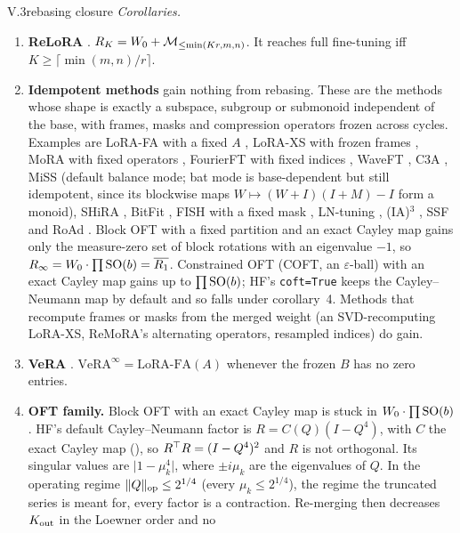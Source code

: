 \begin{theorem}{V.3}{rebasing closure}
\emph{Corollaries.}
\begin{enumerate}[label=\arabic*.,leftmargin=1.6em]
  \item \textbf{ReLoRA} \citep{lialin2023relora}. $R_K=W_0+\mathcal{M}_{\le\min(Kr,m,n)}$. It reaches full fine-tuning iff
  $K\ge\lceil\min(m,n)/r\rceil$.
  \item \textbf{Idempotent methods} gain nothing from rebasing. These are the methods whose shape is exactly a
  subspace, subgroup or submonoid independent of the base, with frames, masks and compression operators frozen across
  cycles. Examples are LoRA-FA with a fixed $A$ \citep{zhang2023lora}, LoRA-XS with frozen frames
  \citep{baazy2024lora}, MoRA with fixed operators \citep{jiang2024mora}, FourierFT with fixed indices
  \citep{gao2024parameter}, WaveFT \citep{bilican2025exploring}, C3A \citep{chen2024parameter}, MiSS
  \citep{kang2024miss} (default balance mode; bat mode is base-dependent but still idempotent, since its blockwise maps
  $W\mapsto(W+I)(I+M)-I$ form a monoid), SHiRA \citep{bhardwaj2024sparse}, BitFit \citep{benzaken2021bitfit}, FISH
  with a fixed mask \citep{sung2021training}, LN-tuning \citep{zhao2023tuning}, (IA)$^3$ \citep{liu2022few}, SSF
  \citep{lian2022scaling} and RoAd \citep{liao20243}. Block OFT with a fixed partition and an exact Cayley map gains
  only the measure-zero set of block rotations with an eigenvalue $-1$, so $R_\infty=W_0\cdot\prod\mathrm{SO}(b)=\overline{R_1}$.
  Constrained OFT (COFT, an $\varepsilon$-ball) with an exact Cayley map gains up to $\prod\mathrm{SO}(b)$; HF's
  \texttt{coft=True} keeps the Cayley--Neumann map by default and so falls under corollary~4. Methods that recompute
  frames or masks from the merged weight (an SVD-recomputing LoRA-XS, ReMoRA's alternating operators, resampled
  indices) do gain.
  \item \textbf{VeRA} \citep{kopiczko2023vera}. $\mathrm{VeRA}^\infty=\text{LoRA-FA}(A)$ whenever the frozen $B$ has no
  zero entries.
  \item \textbf{OFT family.} Block OFT with an exact Cayley map is stuck in $W_0\cdot\prod\mathrm{SO}(b)$. HF's default
  Cayley--Neumann factor is $R=C(Q)(I-Q^4)$, with $C$ the exact Cayley map (), so $R^{\top} R=(I-Q^4)^2$ and $R$
  is not orthogonal. Its singular values are $\lvert1-\mu_k^4\rvert$, where $\pm i\mu_k$ are the eigenvalues of $Q$.
  In the operating regime $\lVert Q\rVert_{\rm op}\le2^{1/4}$ (every $\mu_k\le2^{1/4}$), the regime the truncated series
  is meant for, every factor is a contraction. Re-merging then decreases $K_{\rm out}$ in the Loewner order and no

\end{enumerate}
\end{theorem}

